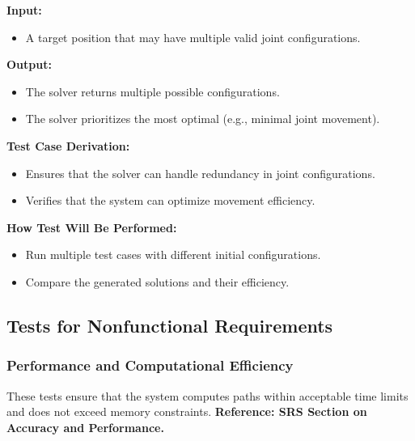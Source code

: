 \documentclass[12pt, titlepage]{article}
\begin{document}
\begin{enumerate}
\textbf{Input:}  
\begin{itemize}
    \item A target position that may have multiple valid joint configurations.
\end{itemize}

\textbf{Output:}  
\begin{itemize}
    \item The solver returns multiple possible configurations.
    \item The solver prioritizes the most optimal (e.g., minimal joint movement).
\end{itemize}

\textbf{Test Case Derivation:}  
\begin{itemize}
    \item Ensures that the solver can handle redundancy in joint configurations.
    \item Verifies that the system can optimize movement efficiency.
\end{itemize}

\textbf{How Test Will Be Performed:}  
\begin{itemize}
    \item Run multiple test cases with different initial configurations.
    \item Compare the generated solutions and their efficiency.
\end{itemize}

\end{enumerate}


\subsection{Tests for Nonfunctional Requirements}

\subsubsection{Performance and Computational Efficiency}

These tests ensure that the system computes paths within acceptable time limits and does not exceed memory constraints. \textbf{Reference: SRS Section on Accuracy and Performance.}
\end{document}
